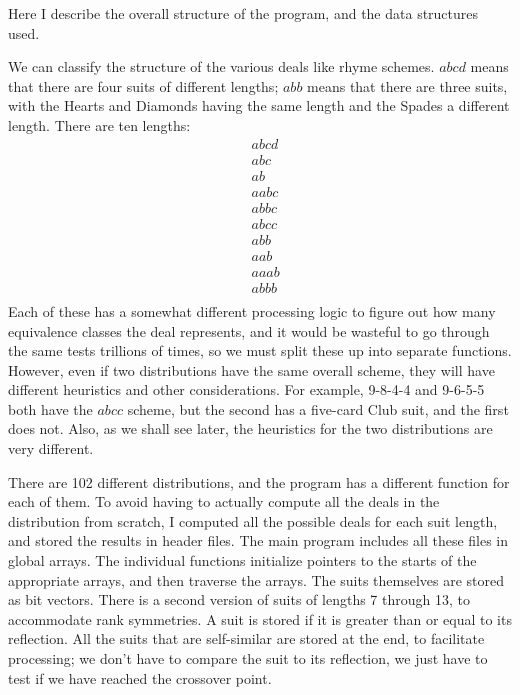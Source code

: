 \documentclass [12pt, letterpaper] {article}
\begin{document}
Here I describe the overall structure of the program, and the data structures used.

We can classify the structure of the various deals like rhyme schemes.  $abcd$ means that there are four suits of different
lengths; $abb$ means that there are three suits, with the Hearts and Diamonds having the same length and the Spades a different length.
There are ten lengths:
\begin{align*}
        &abcd\\
        &abc\\
        &ab\\
        &aabc\\
        &abbc\\
        &abcc\\
        &abb\\
        &aab\\
        &aaab\\
        &abbb\\
\end{align*}
Each of these has a somewhat different processing logic to figure out how many equivalence classes the deal represents,
and it would be wasteful to go through the same tests trillions of times, so we must split these up into separate functions.
However, even if two distributions have the same overall scheme, they will have different heuristics and other considerations.
For example, 9-8-4-4 and 9-6-5-5 both have the $abcc$ scheme, but the second has a five-card Club suit, and the first does not.  
Also, as we shall see later, the heuristics for the two distributions are very different.

There are 102 different distributions, and the program has a different function for each of them.  To avoid having to 
actually compute all the deals in the distribution from scratch, I computed all the possible deals for each suit length, 
and stored the results in header files.  The main program includes all these files in global arrays.  The individual functions
initialize pointers to the starts of the appropriate arrays, and then traverse the arrays.  The suits themselves are stored
as bit vectors.  There is a second version of suits of lengths 7 through 13, to accommodate rank symmetries.  
A suit is stored if it is greater than or equal to its reflection.  All the suits that are self-similar are stored
at the end, to facilitate processing; we don't have to compare the suit to its reflection, we just have to test
if we have reached the crossover point.
\end{document}
